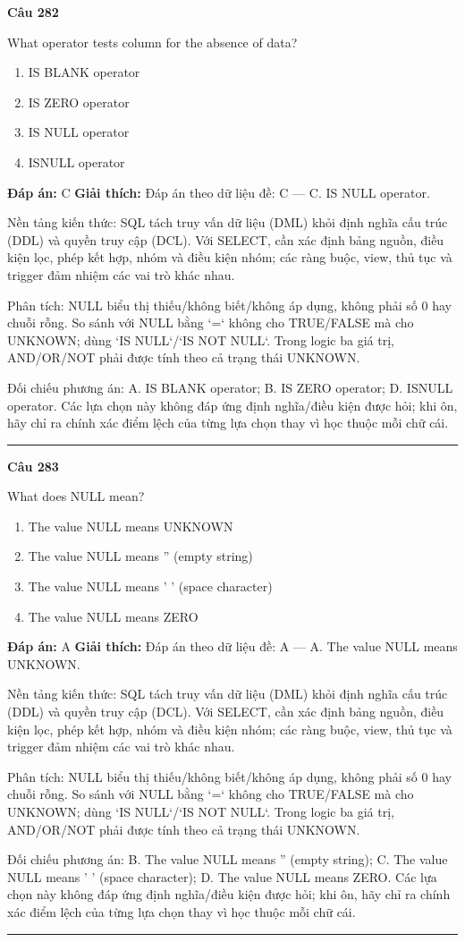 \documentclass[11pt,a4paper]{article}
\newenvironment{question}[1]{%
  \par\vspace{1em}\noindent\textbf{\large Câu #1}\par\vspace{0.4em}
}{%
  \par\vspace{1em}\hrule\vspace{0.6em}
}
\newenvironment{choices}{%
  \begin{enumerate}[label=\textbf{\Alph*.},leftmargin=2.2em,itemsep=2pt,topsep=3pt]
}{%
  \end{enumerate}
}
\newcommand{\choice}{\item}
\begin{document}
\begin{question}{282}
What operator tests column for the absence of data?
\begin{choices}
\choice IS BLANK operator
\choice IS ZERO operator
\choice IS NULL operator
\choice ISNULL operator
\end{choices}
\textbf{Đáp án:} C
\textbf{Giải thích:} Đáp án theo dữ liệu đề: C — C. IS NULL operator.

Nền tảng kiến thức: SQL tách truy vấn dữ liệu (DML) khỏi định nghĩa cấu trúc (DDL) và quyền truy cập (DCL). Với SELECT, cần xác định bảng nguồn, điều kiện lọc, phép kết hợp, nhóm và điều kiện nhóm; các ràng buộc, view, thủ tục và trigger đảm nhiệm các vai trò khác nhau.

Phân tích: NULL biểu thị thiếu/không biết/không áp dụng, không phải số 0 hay chuỗi rỗng. So sánh với NULL bằng `=` không cho TRUE/FALSE mà cho UNKNOWN; dùng `IS NULL`/`IS NOT NULL`. Trong logic ba giá trị, AND/OR/NOT phải được tính theo cả trạng thái UNKNOWN.

Đối chiếu phương án: A. IS BLANK operator; B. IS ZERO operator; D. ISNULL operator. Các lựa chọn này không đáp ứng định nghĩa/điều kiện được hỏi; khi ôn, hãy chỉ ra chính xác điểm lệch của từng lựa chọn thay vì học thuộc mỗi chữ cái.
\end{question}

\begin{question}{283}
What does NULL mean?
\begin{choices}
\choice The value NULL means UNKNOWN
\choice The value NULL means '' (empty string)
\choice The value NULL means ' ' (space character)
\choice The value NULL means ZERO
\end{choices}
\textbf{Đáp án:} A
\textbf{Giải thích:} Đáp án theo dữ liệu đề: A — A. The value NULL means UNKNOWN.

Nền tảng kiến thức: SQL tách truy vấn dữ liệu (DML) khỏi định nghĩa cấu trúc (DDL) và quyền truy cập (DCL). Với SELECT, cần xác định bảng nguồn, điều kiện lọc, phép kết hợp, nhóm và điều kiện nhóm; các ràng buộc, view, thủ tục và trigger đảm nhiệm các vai trò khác nhau.

Phân tích: NULL biểu thị thiếu/không biết/không áp dụng, không phải số 0 hay chuỗi rỗng. So sánh với NULL bằng `=` không cho TRUE/FALSE mà cho UNKNOWN; dùng `IS NULL`/`IS NOT NULL`. Trong logic ba giá trị, AND/OR/NOT phải được tính theo cả trạng thái UNKNOWN.

Đối chiếu phương án: B. The value NULL means '' (empty string); C. The value NULL means ' ' (space character); D. The value NULL means ZERO. Các lựa chọn này không đáp ứng định nghĩa/điều kiện được hỏi; khi ôn, hãy chỉ ra chính xác điểm lệch của từng lựa chọn thay vì học thuộc mỗi chữ cái.
\end{question}
\end{document}
